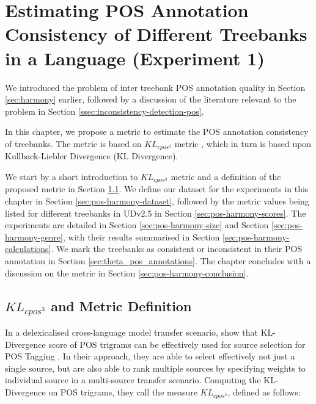 \chapter{Estimating POS Annotation Consistency of Different Treebanks in a Language (Experiment 1)}
\label{chap:pos-harmony}

We introduced the problem of inter treebank POS annotation quality in Section \ref{sec:harmony} earlier, followed by a discussion of the literature relevant to the problem in Section \ref{ssec:inconsistency-detection-pos}. 

In this chapter, we propose a metric to estimate the POS annotation consistency of treebanks. The metric is based on $KL_{cpos^3}$ metric \citep{klcpos3}, which in turn is based upon Kullback-Liebler Divergence (KL Divergence). 

We start by a short introduction to $KL_{cpos^3}$ metric and a definition of the proposed metric in Section \ref{sec:pos-harmony-definition}. We define our dataset for the experiments in this chapter in Section \ref{sec:pos-harmony-dataset}, followed by the metric values being listed for different treebanks in UDv2.5 \citep{UDv2.5} in Section \ref{sec:pos-harmony-scores}. The experiments are detailed in Section \ref{sec:pos-harmony-size} and Section \ref{sec:pos-harmony-genre}, with their results summarised in Section \ref{sec:pos-harmony-calculations}. We mark the treebanks as consistent or inconsistent in their POS annotation in Section \ref{sec:theta_pos_annotations}. The chapter concludes with a discussion on the metric in Section \ref{sec:pos-harmony-conclusion}.

\section{\texorpdfstring{$KL_{cpos^3}$}{KLcpos3} and Metric Definition}
\label{sec:pos-harmony-definition}

In a delexicalised cross-language model transfer scenario, \cite{klcpos3} show that KL-Divergence score of POS trigrams can be effectively used for source selection for POS Tagging . In their approach, they are able to select effectively not just a single source, but are also able to rank multiple sources by specifying weights to individual source in a multi-source transfer scenario. Computing the KL-Divergence on POS trigrams, they call the measure $KL_{cpos^3}$, defined as follows:

